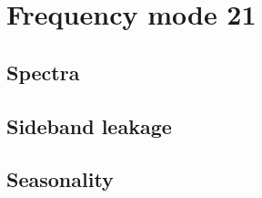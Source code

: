 \section{Frequency mode 21}
\subsection{Spectra}

\subsection{Sideband leakage}

\subsection{Seasonality}

